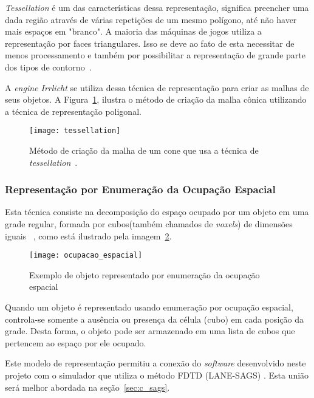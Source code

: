	\textit{Tessellation} é um das características dessa representação, significa preencher uma dada região através de várias repetições de um mesmo polígono, até não haver mais espaços em "branco". A maioria das máquinas de jogos utiliza a representação por faces triangulares. Isso se deve ao fato de esta necessitar de menos processamento e também por possibilitar a representação de grande parte dos tipos de contorno~\cite{traina}.

	A \textit{engine Irrlicht} se utiliza dessa técnica de representação para criar as malhas de seus objetos. A Figura~\ref{fg:tessellation}, ilustra o método de criação da malha cônica utilizando a técnica de representação poligonal.
\begin{figure}[ht!]
	\centering
	\texttt{[image: tessellation]}
	\caption{Método de criação da malha de um cone que usa a técnica de \textit{tessellation}~\cite{tesselation}.}
	\label{fg:tessellation}
\end{figure} 

\subsubsection{Representação por Enumeração da Ocupação Espacial}
	Esta técnica consiste na decomposição do espaço ocupado por um objeto em uma grade regular, formada por cubos(também chamados de \textit{voxels}) de dimensões iguais~\cite{ocupacaoespacial} , como está ilustrado pela imagem~\ref{fg:ocupacao_espacial}.
\begin{figure}[ht!]
	\centering
	\texttt{[image: ocupacao\_espacial]}
	\caption{Exemplo de objeto representado por enumeração da ocupação espacial}
	\label{fg:ocupacao_espacial}
\end{figure} 

	Quando um objeto é representado usando enumeração por ocupação espacial, controla-se somente a ausência ou presença da célula (cubo) em cada posição da grade. Desta forma, o objeto pode ser armazenado em uma lista de cubos que pertencem ao espaço por ele ocupado.

	Este modelo de representação permitiu a conexão do \textit{software} desenvolvido neste projeto com o simulador que utiliza o método FDTD (LANE-SAGS) . Esta união será melhor abordada na seção~\ref{sec:c_sags}.
